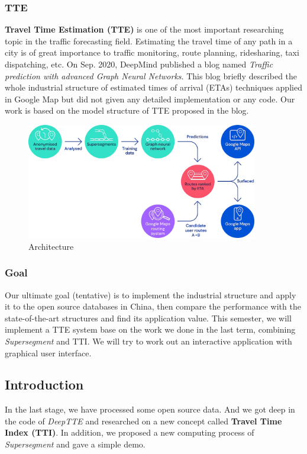 \documentclass[fontset=none]{ctexart}
\theoremstyle{definition}
\theoremstyle{remark}
\begin{document}
\subsubsection{TTE}
\textbf{Travel Time Estimation (TTE)} is one of the most important researching topic in the traffic forecasting field. 
Estimating the travel time of any path in a city is of great importance to traffic monitoring, route planning, ridesharing, taxi dispatching, etc.
On Sep. 2020, DeepMind published a blog named \textit{Traffic prediction with advanced Graph Neural Networks}. 
This blog briefly described the whole industrial structure of estimated times of arrival (ETAs) techniques applied in Google Map but did not given any detailed implementation or any code.
Our work is based on the model structure of TTE proposed in the blog.
\begin{figure}[htb]
    \centering
    \includegraphics[width=0.9\textwidth]{images/architecture.png}
    \caption{Architecture}
    \label{fig1}
\end{figure}

\subsubsection{Goal}
Our ultimate goal (tentative) is to implement the industrial structure and apply it to the open source databases in China, then compare the performance with the state-of-the-art structures and find its application value.
This semester, we will implement a TTE system base on the work we done in the last term, combining \textit{Supersegment} and TTI.
We will try to work out an interactive application with graphical user interface. 

\subsection{Introduction}
In the last stage, we have processed some open source data. And we got deep in the code of \textit{DeepTTE} and researched on a new concept
called \textbf{Travel Time Index (TTI)}. In addition, we proposed a new computing process of \textit{Supersegment} and gave a simple demo.
\end{document}
